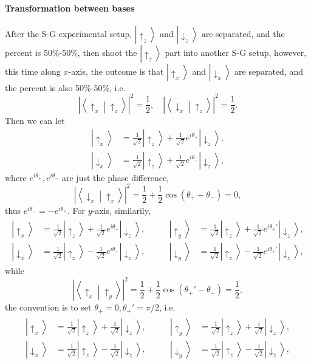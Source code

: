 \documentclass{article}
\def\u{\uparrow}\def\v{\downarrow}
\newcommand{\ket}[1]{\left\vert #1\right\rangle}
\newcommand{\brkt}[2]{\left\langle #1\middle\vert#2\right\rangle}
\begin{document}
\paragraph{Transformation between bases} After the S-G experimental setup, $\ket{\u_z}$ and $\ket{\v_z}$ are separated, and the percent is 50\%-50\%, then shoot the $\ket{\u_z}$ part into another S-G setup, however, this time along $x$-axis, the outcome is that $\ket{\u_x}$ and $\ket{\v_x}$ are separated, and the percent is also 50\%-50\%, i.e.
$$\left\vert\brkt{\u_x}{\u_z}\right\vert^2=\frac12,\quad\left\vert\brkt{\v_x}{\u_z}\right\vert^2=\frac12.$$
Then we can let
\begin{align*}
	\ket{\u_x} & =\frac1{\sqrt2}\ket{\u_z}+\frac1{\sqrt2}e^{i\theta_+}\ket{\v_z}, \\
	\ket{\v_x} & =\frac1{\sqrt2}\ket{\u_z}+\frac1{\sqrt2}e^{i\theta_-}\ket{\v_z},
\end{align*}
where $e^{i\theta_+},e^{i\theta_-}$ are just the phase difference,$$\left\vert\brkt{\v_x}{\u_x}\right\vert^2=\frac12+\frac12\cos(\theta_+-\theta_-)=0,$$
thus $e^{i\theta_-}=-e^{i\theta_+}$. For $y$-axis, similarily,
\begin{align*}
	\begin{aligned}
		\ket{\u_x} & =\frac1{\sqrt2}\ket{\u_z}+\frac1{\sqrt2}e^{i\theta_+}\ket{\v_z}, \\
		\ket{\v_x} & =\frac1{\sqrt2}\ket{\u_z}-\frac1{\sqrt2}e^{i\theta_+}\ket{\v_z},
	\end{aligned}\qquad
	\begin{aligned}
		\ket{\u_y} & =\frac1{\sqrt2}\ket{\u_z}+\frac1{\sqrt2}e^{i\theta_+'}\ket{\v_z}, \\
		\ket{\v_y} & =\frac1{\sqrt2}\ket{\u_z}-\frac1{\sqrt2}e^{i\theta_+'}\ket{\v_z},
	\end{aligned}
\end{align*}
while
$$\left\vert\brkt{\u_x}{\u_y}\right\vert^2=\frac12+\frac12\cos(\theta_+'-\theta_+)=\frac12,$$
the convention is to set $\theta_+=0,\theta_+'=\pi/2$, i.e.
\begin{align*}
	\begin{aligned}
		\ket{\u_x} & =\frac1{\sqrt2}\ket{\u_z}+\frac1{\sqrt2}\ket{\v_z}, \\
		\ket{\v_x} & =\frac1{\sqrt2}\ket{\u_z}-\frac1{\sqrt2}\ket{\v_z},
	\end{aligned}\qquad
	\begin{aligned}
		\ket{\u_y} & =\frac1{\sqrt2}\ket{\u_z}+\frac{i}{\sqrt2}\ket{\v_z}, \\
		\ket{\v_y} & =\frac1{\sqrt2}\ket{\u_z}-\frac{i}{\sqrt2}\ket{\v_z},
	\end{aligned}
\end{align*}
\end{document}
